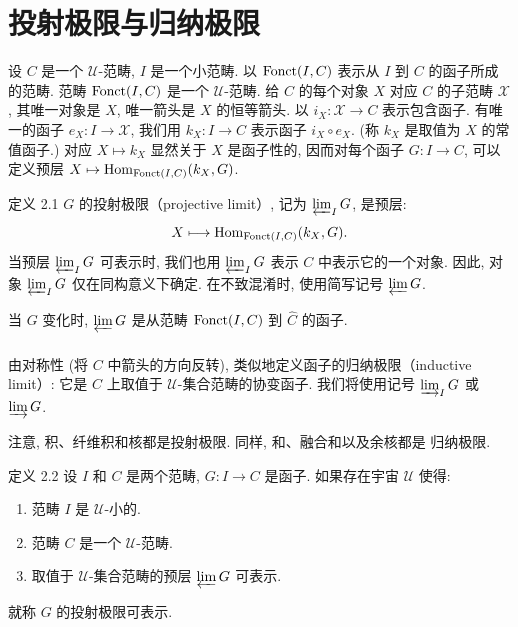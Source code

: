 

\section{投射极限与归纳极限}

设 $C$ 是一个 $𝒰$-范畴, $I$ 是一个小范畴.
以 $\operatorname{Fonct}(I,C)$ 表示从 $I$ 到 $C$ 的函子所成的范畴.
范畴 $\operatorname{Fonct}(I,C)$ 是一个 $𝒰$-范畴.
给 $C$ 的每个对象 $X$ 对应 $C$ 的子范畴 $𝒳$,
其唯一对象是 $X$, 唯一箭头是 $X$ 的恒等箭头.
以 $i_X:𝒳\rightarrow C$ 表示包含函子.
有唯一的函子 $e_X:I\rightarrow 𝒳$,
我们用 $k_X:I\rightarrow C$ 表示函子 $i_X\circ
e_X$. (称 $k_X$ 是取值为 $X$ 的常值函子.)
对应 $X\mapsto k_X$ 显然关于 $X$ 是函子性的,
因而对每个函子 $G:I\rightarrow
C$, 可以定义预层 $X\mapsto \operatorname{Hom}_{\operatorname{Fonct}(I,C)}(k_X,G)$.

\begin{enonce*}{定义 2.1}
$G$ 的投射极限（projective limit）, 记为 $\varprojlim_I G$, 是预层:
$$
X\longmapsto \operatorname{Hom}_{\operatorname{Fonct}(I,C)}(k_X,G){}.
$$
当预层 $\varprojlim_I G$ 可表示时,
我们也用 $\varprojlim_I G$ 表示 $C$ 中表示它的一个\pageoriginale{}对象.
因此, 对象 $\varprojlim_I G$ 仅在同构意义下确定.
在不致混淆时, 使用简写记号 $\varprojlim G$.
\end{enonce*}

当 $G$ 变化时, $\varprojlim G$ 是从范畴
$\operatorname{Fonct}(I,C)$ 到 $\widehat{C}$ 的函子.

\setcounter{subsection}{1} \setcounter{subsubsection}{0}
\subsubsection{}
由对称性 (将 $C$ 中箭头的方向反转),
类似地定义函子的归纳极限（inductive limit）:
它是 $C$ 上取值于 $𝒰$-集合范畴的协变函子.
我们将使用记号 $\varinjlim_I
G$ 或 $\varinjlim G$.

注意, 积、纤维积和核都是投射极限.
同样, 和、融合和以及余核都是
归纳极限.

\begin{enonce*}{定义 2.2}
设 $I$ 和 $C$ 是两个范畴, $G:I\rightarrow C$ 是函子.
如果存在宇宙 $𝒰$ 使得:
\begin{enumerate}
\renewcommand{\labelenumi}{\theenumi)}
\item 范畴 $I$ 是 $𝒰$-小的.

\item 范畴 $C$ 是一个 $𝒰$-范畴.

\item 取值于 $𝒰$-集合范畴的预层 $\varprojlim G$ 可表示.
\end{enumerate}
就称 $G$ 的投射极限可表示.
\end{enonce*}

